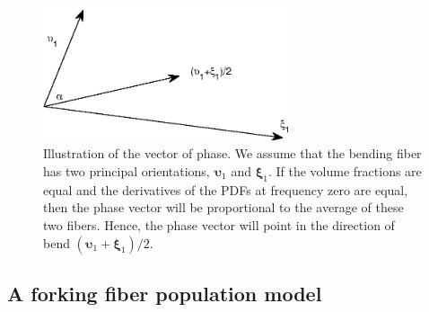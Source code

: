 \documentclass[authoryear,preprint,12pt]{elsarticle}
\newcommand{\bsu}{\bs{\upsilon}}
\newcommand{\bs}[1]{\boldsymbol{#1}}
\begin{document}
\begin{figure}[!htbp]
  \begin{center}
    \includegraphics[width=0.65\textwidth]{bending15.eps}
  \end{center}
  \caption{Illustration of the vector of phase.  We assume that the
    bending fiber has two principal orientations, $\bsu_1$ and
    $\bs{\xi}_1$.  If the volume fractions are equal and the
    derivatives of the PDFs at frequency zero are equal, then the
    phase vector will be proportional to the average of these two
    fibers.  Hence, the phase vector will point in the direction of
    bend $(\bsu_1+\bs{\xi}_1)/2$.}
  \label{bending15}
\end{figure}

\subsection{A forking fiber population model}
\end{document}
